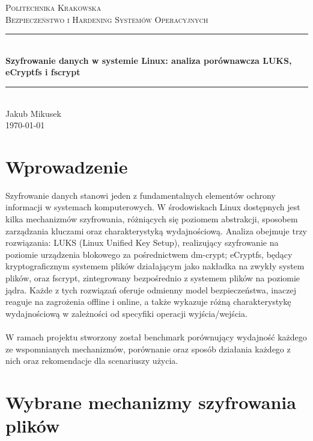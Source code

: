 \documentclass[a4paper]{article}
\begin{document}
\begin{titlepage}

\newcommand{\HRule}{\rule{\linewidth}{0.5mm}}
\center

\textsc{\LARGE Politechnika Krakowska}\\[1cm]

\textsc{\Large Bezpieczeństwo i Hardening Systemów Operacyjnych}\\[0.2cm]
\HRule \\[0.8cm]
{ \huge \bfseries Szyfrowanie danych w systemie Linux: analiza porównawcza LUKS, eCryptfs i fscrypt }\\[0.7cm]
\HRule \\[2cm]
\Large Jakub Mikusek\\[1.5cm]
{\large \today}\\[5cm]
\vfill
\end{titlepage}

\section{Wprowadzenie}
Szyfrowanie danych stanowi jeden z fundamentalnych elementów ochrony informacji w systemach
komputerowych. W środowiskach Linux dostępnych jest kilka mechanizmów szyfrowania, różniących
się poziomem abstrakcji, sposobem zarządzania kluczami oraz charakterystyką wydajnościową.
Analiza obejmuje trzy rozwiązania: LUKS (Linux Unified Key Setup), realizujący szyfrowanie
na poziomie urządzenia blokowego za pośrednictwem dm-crypt; eCryptfs, będący kryptograficznym
systemem plików działającym jako nakładka na zwykły system plików, oraz fscrypt, zintegrowany
bezpośrednio z systemem plików na poziomie jądra. Każde z tych rozwiązań oferuje odmienny model
bezpieczeństwa, inaczej reaguje na zagrożenia offline i online, a także wykazuje różną
charakterystykę wydajnościową w zależności od specyfiki operacji wyjścia/wejścia.
\\\\
W ramach projektu stworzony został benchmark porównujący wydajność każdego ze wspomnianych
mechanizmów, porównanie oraz sposób działania każdego z nich oraz rekomendacje dla scenariuszy
użycia.


\section{Wybrane mechanizmy szyfrowania plików}
\end{document}
